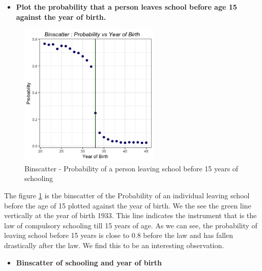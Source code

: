 \documentclass[a4paper,12pt,oneside,English]{article}
\begin{document}
\begin{itemize}
    \item \textbf{Plot the probability that a person leaves school before age 15 against the year of birth.}
\end{itemize}
 {\begin{figure}[h!]
    \centering
    \includegraphics[width=0.6\textwidth]{Binscatter 2.jpeg}
    \caption{Binscatter - Probability of a person leaving school before 15 years of schooling}
    \label{fig 1}
    \end{figure}}
The figure \ref{fig 1} is the binscatter of the Probability of an individual leaving school before the age of 15 plotted against the year of birth. We the see the green line vertically at the year of birth 1933. This line indicates the instrument that is the law of compulsory schooling till 15 years of age. As we can see, the probability of leaving school before 15 years is close to 0.8 before the law and has fallen drastically after the law. We find this to be an interesting observation.\\
\begin{itemize}
    \item \textbf{Binscatter of schooling and year of birth}
\end{itemize}
\end{document}
